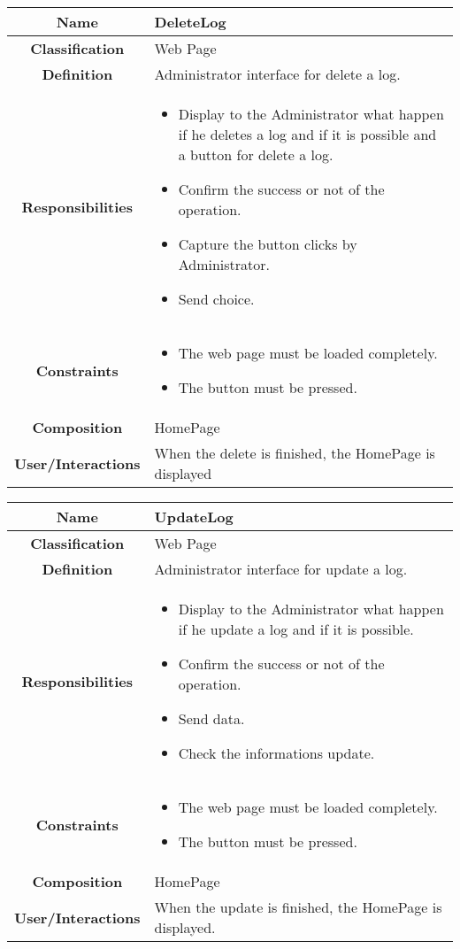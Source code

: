\documentclass[11pt, a4paper,titlepage]{article}
\begin{document}
\begin{enumerate}
\begin{tabularx}{\textwidth}{| c | X |}
	\hline
	\textbf{Name} & 
	DeleteLog
	\\
	\hline
	\textbf{Classification} & 
	Web Page
	\\
	\hline
	\textbf{Definition} & 
	Administrator interface for delete a log.\\
	\hline
	\textbf{Responsibilities} &
	\begin{itemize}
		\item Display to the Administrator what happen if he deletes a log and if it is possible and a button for delete a log.
		\item Confirm the success or not of the operation.
		\item Capture the button clicks by Administrator.
		\item Send choice.
	\end{itemize}
	\\
	\hline
	\textbf{Constraints} & 
	\begin{itemize}
		\item  The web page must be loaded completely.
		\item The button must be pressed.
	\end{itemize}
	\\
	\hline
	\textbf{Composition} & HomePage
	\\
	\hline
	\textbf{User/Interactions} & 
	When the delete is finished, the HomePage is displayed
	\\
	\hline	
\end{tabularx}

\begin{tabularx}{\textwidth}{| c | X |}
	\hline
	\textbf{Name} & 
	UpdateLog
	\\
	\hline
	\textbf{Classification} & 
	Web Page
	\\
	\hline
	\textbf{Definition} & 
	Administrator interface for update a log.\\
	\hline
	\textbf{Responsibilities} &
	\begin{itemize}
		\item Display to the Administrator what happen if he update a log and if it is possible.
		\item Confirm the success or not of the operation.
		\item Send data.
		\item Check the informations update.
	\end{itemize}
	\\
	\hline
	\textbf{Constraints} & 
	\begin{itemize}
		\item  The web page must be loaded completely.
		\item The button must be pressed.
	\end{itemize}
	\\
	\hline
	\textbf{Composition} & HomePage
	\\
	\hline
	\textbf{User/Interactions} & 
	When the update is finished, the HomePage is displayed.
	\\
	\hline	
\end{tabularx}


\end{enumerate}
\end{document}
